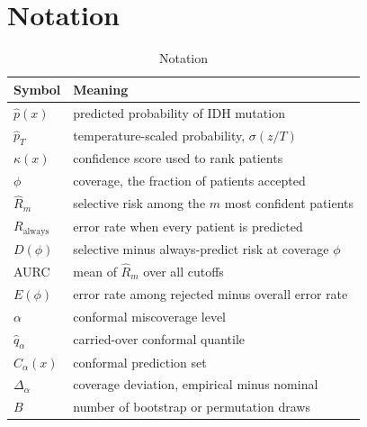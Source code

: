\documentclass[journal]{IEEEtran}
\begin{document}
\section{Notation}
\label{app:notation}
\begin{table}[!ht]
\centering
\caption{Notation}
\label{tab:notation}
\footnotesize
\begin{tabular}{lp{}}
\toprule
Symbol & Meaning \\
\midrule
$\hat p(x)$ & predicted probability of IDH mutation \\
$\hat p_T$ & temperature-scaled probability, $\sigma(z/T)$ \\
$\kappa(x)$ & confidence score used to rank patients \\
$\phi$ & coverage, the fraction of patients accepted \\
$\hat R_m$ & selective risk among the $m$ most confident patients \\
$R_{\mathrm{always}}$ & error rate when every patient is predicted \\
$D(\phi)$ & selective minus always-predict risk at coverage $\phi$ \\
AURC & mean of $\hat R_m$ over all cutoffs \\
$E(\phi)$ & error rate among rejected minus overall error rate \\
$\alpha$ & conformal miscoverage level \\
$\hat q_\alpha$ & carried-over conformal quantile \\
$C_\alpha(x)$ & conformal prediction set \\
$\Delta_\alpha$ & coverage deviation, empirical minus nominal \\
$B$ & number of bootstrap or permutation draws \\
\bottomrule
\end{tabular}
\end{table}
\end{document}

